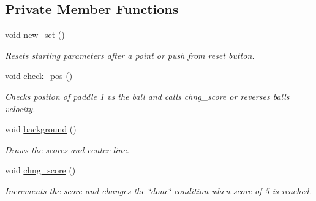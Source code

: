 \subsection*{Private Member Functions}
\begin{DoxyCompactItemize}
\item 
void \hyperlink{class_c_pong_ab089f6ea43ba4fcfcea0a283606d5cff}{new\+\_\+set} ()
\begin{DoxyCompactList}\small\item\em Resets starting parameters after a point or push from reset button. \end{DoxyCompactList}\item 
void \hyperlink{class_c_pong_ac4bb5edb99ea879275443416dcbdd58f}{check\+\_\+pos} ()
\begin{DoxyCompactList}\small\item\em Checks positon of paddle 1 vs the ball and calls chng\+\_\+score or reverses balls velocity. \end{DoxyCompactList}\item 
void \hyperlink{class_c_pong_a99bf9f1ffa60360e851a2e2bfc6ab379}{background} ()
\begin{DoxyCompactList}\small\item\em Draws the scores and center line. \end{DoxyCompactList}\item 
void \hyperlink{class_c_pong_a310107b0dc9d4a036bc931f75be96140}{chng\+\_\+score} ()
\begin{DoxyCompactList}\small\item\em Increments the score and changes the \char`\"{}done\char`\"{} condition when score of 5 is reached. \end{DoxyCompactList}\end{DoxyCompactItemize}
